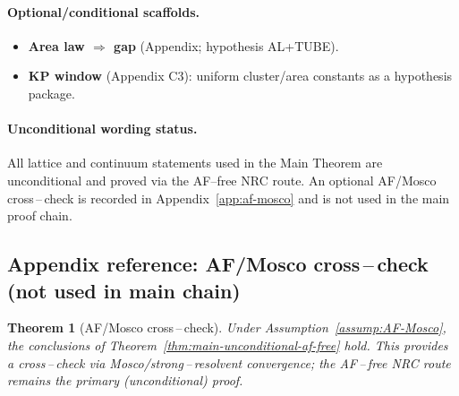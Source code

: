 \documentclass[11pt]{amsart}
\theoremstyle{plain}
\newtheorem{theorem}{Theorem}[section]
\theoremstyle{definition}
\theoremstyle{remark}
\begin{document}
\paragraph{Optional/conditional scaffolds.}
\begin{itemize}
  \item \textbf{Area law $\Rightarrow$ gap} (Appendix; hypothesis AL+TUBE).
  \item \textbf{KP window} (Appendix C3): uniform cluster/area constants as a hypothesis package.
\end{itemize}
\paragraph{Unconditional wording status.}
All lattice and continuum statements used in the Main Theorem are unconditional and proved via the AF--free NRC route. An optional AF/Mosco cross\,–\,check is recorded in Appendix~\ref{app:af-mosco} and is not used in the main proof chain.

\subsection*{Appendix reference: AF/Mosco cross\,–\,check (not used in main chain)}\label{app:af-mosco}
\begin{theorem}[AF/Mosco cross\,–\,check]\label{thm:af-mosco-crosscheck}
Under Assumption~\ref{assump:AF-Mosco}, the conclusions of Theorem~\ref{thm:main-unconditional-af-free} hold. This provides a cross\,–\,check via Mosco/strong\,–\,resolvent convergence; the AF\,–\,free NRC route remains the primary (unconditional) proof.
\end{theorem}
\end{document}
